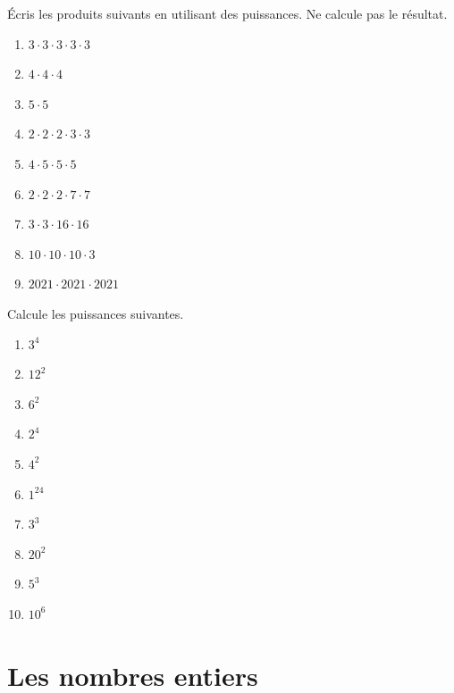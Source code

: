 \documentclass[10pt,a4paper]{article}
\begin{document}
\begin{exercise}
	Écris les produits suivants en utilisant des puissances. Ne calcule pas le résultat.
	\begin{enumerate}[cols=4]
		\item $3\cdot 3\cdot 3\cdot 3\cdot 3$
		\item $4\cdot 4\cdot 4$
		\item $5\cdot 5$
		\item $2\cdot 2\cdot 2\cdot 3\cdot 3$
		\item $4\cdot 5\cdot 5\cdot 5$
		\item $2\cdot 2\cdot 2\cdot 7\cdot 7$
		\item $3\cdot 3\cdot 16\cdot 16$
		\item $10\cdot 10\cdot 10\cdot 3$
		\item $2021\cdot 2021\cdot 2021$
	\end{enumerate}	
\end{exercise}

\begin{exercise}
	Calcule les puissances suivantes.
			\begin{enumerate}[cols=6]
				\item $3^4$
				\item $12^2$
				\item $6^2$
				\item $2^4$
				\item $4^2$
				\item $1^{24}$
				\item $3^3$
				\item $20^2$
				\item $5^3$
				\item $10^6$
			\end{enumerate}
\end{exercise}

\section{Les nombres entiers}
\end{document}
